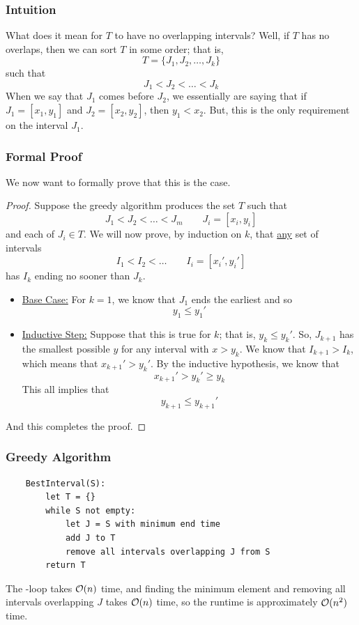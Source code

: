 \documentclass[letterpaper]{article}
\begin{document}
\subsubsection{Intuition}
What does it mean for $T$ to have no overlapping intervals? Well, if $T$ has no overlaps, then we can sort $T$ in some order; that is, 
\[T = \{J_1, J_2, \dots, J_k\}\]
such that 
\[J_1 < J_2 < \dots < J_k\]
When we say that $J_1$ comes before $J_2$, we essentially are saying that if $J_1 = [x_1, y_1]$ and $J_2 = [x_2, y_2]$, then $y_1 < x_2$. But, this is the only requirement on the interval $J_1$. 

\subsubsection{Formal Proof}
We now want to formally prove that this is the case. 
\begin{mdframed}[]
    \begin{proof}
        Suppose the greedy algorithm produces the set $T$ such that 
        \[J_1 < J_2 < \dots < J_m \qquad J_i = [x_i, y_i]\]
        and each of $J_i \in T$. We will now prove, by induction on $k$, that \underline{any} set of intervals
        \[I_1 < I_2 < \dots \qquad I_i = [x_i', y_i']\]
        has $I_k$ ending no sooner than $J_k$. 
        \begin{itemize}
            \item \underline{Base Case:} For $k = 1$, we know that $J_1$ ends the earliest and so 
            \[y_1 \leq y_1'\]

            \item \underline{Inductive Step:} Suppose that this is true for $k$; that is, $y_k \leq y_k'$. So, $J_{k + 1}$ has the smallest possible $y$ for any interval with $x > y_k$. We know that $I_{k + 1} > I_k$, which means that $x_{k + 1}' > y_k'$. By the inductive hypothesis, we know that 
            \[x_{k + 1}' > y_k' \geq y_k\]
            This all implies that 
            \[y_{k + 1} \leq y_{k + 1}'\]
        \end{itemize}
        And this completes the proof. 
    \end{proof}
\end{mdframed}

\subsubsection{Greedy Algorithm}
\begin{verbatim}
    BestInterval(S):
        let T = {}
        while S not empty:
            let J = S with minimum end time 
            add J to T 
            remove all intervals overlapping J from S
        return T
\end{verbatim}
The -loop takes $\mathcal{O}(n)$ time, and finding the minimum element and removing all intervals overlapping $J$ takes $\mathcal{O}(n)$ time, so the runtime is approximately $\mathcal{O}(n^2)$ time. 
\end{document}
